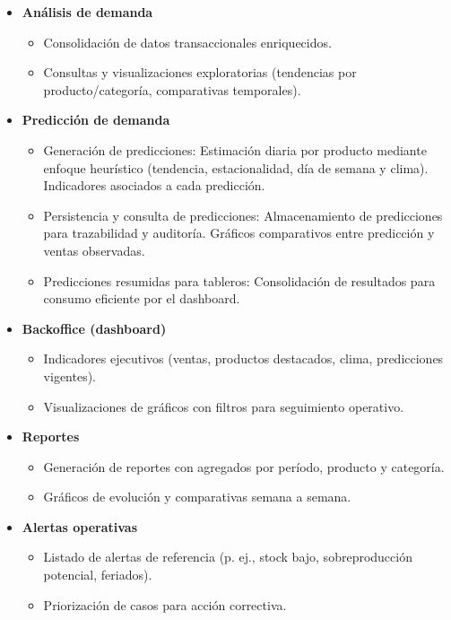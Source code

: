 \begin{itemize}
    \item \textbf{Análisis de demanda}
    \begin{itemize}
        \item Consolidación de datos transaccionales enriquecidos.
        \item Consultas y visualizaciones exploratorias (tendencias por producto/categoría, comparativas temporales).
    \end{itemize}

    \item \textbf{Predicción de demanda}
    \begin{itemize}
        \item Generación de predicciones: Estimación diaria por producto mediante enfoque heurístico (tendencia, estacionalidad, día de semana y clima). Indicadores asociados a cada predicción.
        \item Persistencia y consulta de predicciones: Almacenamiento de predicciones para trazabilidad y auditoría. Gráficos comparativos entre predicción y ventas observadas.
        \item Predicciones resumidas para tableros: Consolidación de resultados para consumo eficiente por el dashboard.
    \end{itemize}

    \item \textbf{Backoffice (dashboard)}
    \begin{itemize}
        \item Indicadores ejecutivos (ventas, productos destacados, clima, predicciones vigentes).
        \item Visualizaciones de gráficos con filtros para seguimiento operativo.
    \end{itemize}

    \item \textbf{Reportes}
    \begin{itemize}
        \item Generación de reportes con agregados por período, producto y categoría.
        \item Gráficos de evolución y comparativas semana a semana.
    \end{itemize}

    \item \textbf{Alertas operativas}
    \begin{itemize}
        \item Listado de alertas de referencia (p. ej., stock bajo, sobreproducción potencial, feriados).
        \item Priorización de casos para acción correctiva.
    \end{itemize}


\end{itemize}
